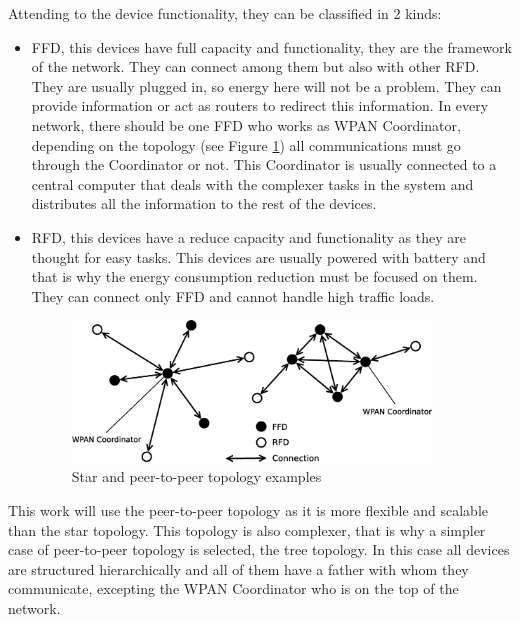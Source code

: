 Attending to the device functionality, they can be classified in 2 kinds:

\begin{itemize}
 \item \acl{FFD}, this devices have full capacity and functionality, they are the framework of the network. They can connect 
among them but also with other RFD. They are usually plugged in, so energy here will not be a problem. They can provide 
information or act as routers to redirect this information. In every network, there should be one \ac{FFD} who works as \ac{WPAN}
Coordinator, depending on the topology (see Figure \ref{fig:WPAN_Network_Topologies}) all communications must go through the 
Coordinator or not. This Coordinator is usually connected to a central computer that deals with the complexer tasks in the system 
and distributes all the information to the rest of the devices.
 \item \acl{RFD}, this devices have a reduce capacity and functionality as they are thought for easy tasks. This devices are
usually powered with battery and that is why the energy consumption reduction must be focused on them. They can connect only
\ac{FFD} and cannot handle high traffic loads.

\vspace*{1cm}

\begin{figure}[here]
 \begin{center}
  \includegraphics[width=0.9\textwidth]{WPAN_Network_Topologies.eps}
 \end{center}
 \caption{Star and peer-to-peer topology examples \cite{IEEE802.15.4-2003}}
 \label{fig:WPAN_Network_Topologies}
\end{figure}
\end{itemize}
This work will use the peer-to-peer topology as it is more flexible and scalable than the star topology. This topology is also
complexer, that is why a simpler case of peer-to-peer topology is selected, the tree topology. In this case all devices are
structured hierarchically and all of them have a father with whom they communicate, excepting the \ac{WPAN} Coordinator who is on the top of the network.

